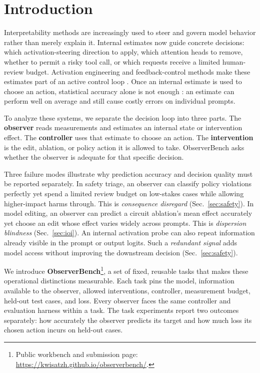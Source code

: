 \section{Introduction}

Interpretability methods are increasingly used to steer and govern model
behavior rather than merely explain it. Internal estimates now guide concrete
decisions: which activation-steering direction to apply, which attention heads
to remove, whether to permit a risky tool call, or which requests receive a
limited human-review budget. Activation engineering and feedback-control
methods make these estimates part of an active control loop
\cite{turner2023activation,zou2023representation,nguyen2025feedback,skifstad2026local}.
Once an internal estimate is used to choose an action, statistical accuracy
alone is not enough
\cite{donti2017task,elmachtoub2022smart,orgad2026actionable}: an estimate can
perform well on average and still cause costly errors on individual prompts.

To analyze these systems, we separate the decision loop into three parts. The
\textbf{observer} reads measurements and estimates an internal state or
intervention effect. The \textbf{controller} uses that estimate to choose an
action. The \textbf{intervention} is the edit, ablation, or policy action it is
allowed to take. ObserverBench asks whether the observer is adequate for that
specific decision.

Three failure modes illustrate why prediction accuracy and decision quality
must be reported separately. In safety triage, an observer can classify policy
violations perfectly yet spend a limited review budget on low-stakes cases
while allowing higher-impact harms through. This is \emph{consequence
disregard} (Sec.~\ref{sec:safety}). In model editing, an observer can predict a
circuit ablation's mean effect accurately yet choose an edit whose effect
varies widely across prompts. This is \emph{dispersion blindness}
(Sec.~\ref{sec:ioi}). An internal activation probe can also repeat information
already visible in the prompt or output logits. Such a \emph{redundant signal}
adds model access without improving the downstream decision
(Sec.~\ref{sec:safety}).

We introduce \textbf{ObserverBench}\footnote{Public workbench and submission
page: \url{https://kwisatzh.github.io/observerbench/}.},
a set of fixed, reusable tasks that makes these operational distinctions
measurable. Each task pins the model, information available to the observer,
allowed interventions, controller, measurement budget, held-out test cases,
and loss. Every observer faces the same controller and evaluation harness
within a task. The task experiments report two outcomes separately: how accurately
the observer predicts its target and how much loss its chosen action incurs on
held-out cases.

